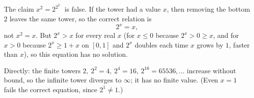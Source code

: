 The claim $x^2=2^{2^{2^{\cdots}}}$ is false. If the tower had a value $x$, then removing the bottom $2$ leaves the same tower, so the correct relation is
\[2^{x}=x,\]
not $x^2=x$. But $2^x>x$ for every real $x$ (for $x\le 0$ because $2^x>0\ge x$, and for $x>0$ because $2^x\ge 1+x$ on $[0,1]$ and $2^x$ doubles each time $x$ grows by $1$, faster than $x$), so this equation has no solution.

Directly: the finite towers $2,\ 2^2=4,\ 2^4=16,\ 2^{16}=65536,\dots$ increase without bound, so the infinite tower diverges to $\boxed{\infty}$; it has no finite value. (Even $x=1$ fails the correct equation, since $2^1\ne1$.)
